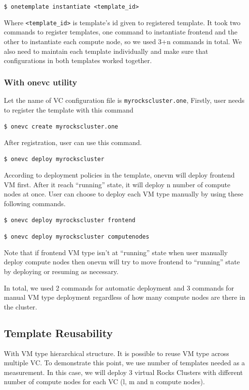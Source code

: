 \documentclass[conference]{IEEEtran}
\begin{document}
\texttt{\$ onetemplate instantiate <template\_id>}

Where \texttt{<template\_id>} is template's id given to registered template.
It took two commands to register templates, one command to instantiate frontend and the other to instantiate each compute node, so we used 3+n commands in total.
We also need to maintain each template individually and make sure that configurations in both templates worked together.

\subsubsection{With onevc utility}

Let the name of VC configuration file is \texttt{myrockscluster.one}, Firstly, user needs to register the template with this command

\texttt{\$ onevc create myrockscluster.one}

After registration, user can use this command.

\texttt{\$ onevc deploy myrockscluster}

According to deployment policies in the template, onevm will deploy frontend VM first.
After it reach ``running'' state, it will deploy n number of compute nodes at once.
User can choose to deploy each VM type manually by using these following commands. 

\texttt{\$ onevc deploy myrockscluster frontend}

\texttt{\$ onevc deploy myrockscluster computenodes}

Note that if frontend VM type isn't at ``running'' state when user manually deploy compute nodes then onevm will try to move frontend to ``running'' state by deploying or resuming as necessary.

In total, we used 2 commands for automatic deployment and 3 commands for manual VM type deployment regardless of how many compute nodes are there in the cluster.

\subsection{Template Reusability}
With VM type hierarchical structure.
It is possible to reuse VM type across multiple VC.
To demonstrate this point, we use number of templates needed as a measurement.
In this case, we will deploy 3 virtual Rocks Clusters\cite{CPE:CPE722} with different number of compute nodes for each VC (l, m and n compute nodes).
\end{document}
